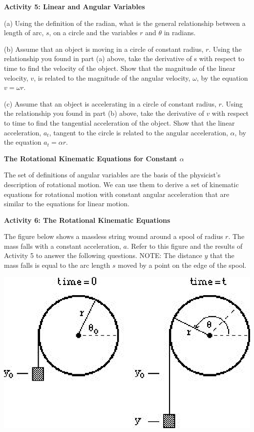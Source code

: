 \textbf{Activity 5: Linear and Angular Variables }

(a) Using the definition of the radian, what is the general relationship between
a length of arc, $s$, on a circle and the variables 
$r$ and \( \theta  \) in radians. 
\vspace{10mm}

(b) Assume that an object is moving in a circle of constant radius, $r$. Using the relationship you found in part (a) above, take the derivative of s with respect to time to find the velocity of the object. Show that the magnitude of the linear velocity, $v$, is related to the magnitude of the angular velocity,
\( \omega  \), by the equation \(v =  \omega r \).
\vspace{20mm}

(c) Assume that an object is accelerating in a circle of constant radius, $r$.
Using the relationship you found in part (b) above, take the derivative of $v$ with respect to time to find the tangential acceleration of the object. Show that the linear acceleration, \( a_{t} \), tangent to the circle is related to the angular acceleration, \( \alpha  \), by the equation \( a_{t}  =  \alpha  r\).
\vspace{20mm}

\textbf{The Rotational Kinematic Equations for Constant \( \alpha  \) }

The set of definitions of angular variables are the basis of the physicist's
description of rotational motion. We can use them to derive a set of kinematic
equations for rotational motion with constant angular acceleration that are
similar to the equations for linear motion. 

\newpage
\textbf{Activity 6: The Rotational Kinematic Equations }

The figure below shows a massless string wound around a spool of radius $r$.
The mass falls with a constant acceleration, $a$. Refer to this figure and the 
results of Activity 5 to answer the following questions. NOTE: The distance 
$y$ that the mass falls is equal to the arc length $s$ moved by a point on the 
edge of the spool.

\vspace{0.3cm}
{\par\centering \includegraphics{rotation/rotation_fig9.eps} \par}
\vspace{0.3cm}

